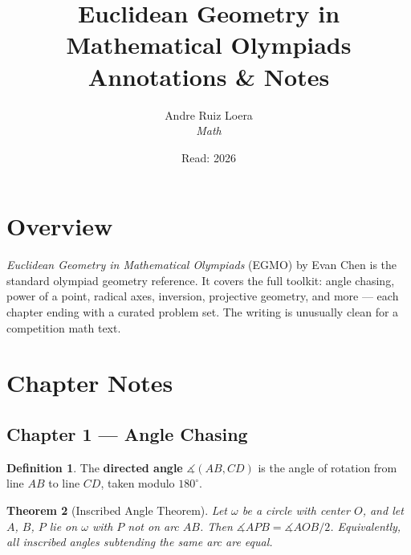 \documentclass[11pt, letterpaper]{article}
\title{Euclidean Geometry in Mathematical Olympiads \\ \large Annotations \& Notes}
\author{Andre Ruiz Loera \\ \small \textit{Math}}
\date{Read: 2026}
\newtheorem{theorem}{Theorem}[section]
\theoremstyle{definition}
\newtheorem{definition}[theorem]{Definition}
\theoremstyle{remark}
\newcommand{\dang}{\measuredangle}          %
\begin{document}
\maketitle
\tableofcontents
\newpage

\section{Overview}

\textit{Euclidean Geometry in Mathematical Olympiads} (EGMO) by Evan Chen is the
standard olympiad geometry reference. It covers the full toolkit: angle chasing,
power of a point, radical axes, inversion, projective geometry, and more --- each
chapter ending with a curated problem set. The writing is unusually clean for a
competition math text.

\section{Chapter Notes}

\subsection{Chapter 1 — Angle Chasing}

\begin{definition}
  The \textbf{directed angle} $\dang(AB, CD)$ is the angle of rotation from
  line $AB$ to line $CD$, taken modulo $180^\circ$.
\end{definition}

\begin{theorem}[Inscribed Angle Theorem]
  Let $\omega$ be a circle with center $O$, and let $A$, $B$, $P$ lie on
  $\omega$ with $P$ not on arc $AB$. Then $\dang APB = \dang AOB / 2$.
  Equivalently, all inscribed angles subtending the same arc are equal.
\end{theorem}

\begin{center}
\end{center}
\end{document}
